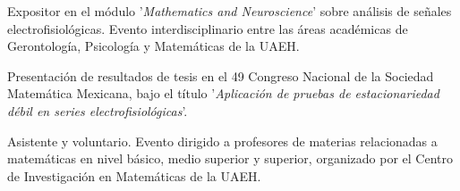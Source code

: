 \documentclass[a4paper,12pt]{memoir} %
\begin{document}
\Sep %



{Expositor en el módulo '\textit{Mathematics and Neuroscience}' sobre análisis de señales
electrofisiológicas. Evento interdisciplinario entre las áreas académicas de Gerontología,
Psicología y Matemáticas de la UAEH.}

{Presentación de resultados de tesis en el 49 Congreso Nacional de la 
Sociedad Matemática Mexicana, bajo el título 
'\textit{Aplicación de pruebas de estacionariedad débil en
series electrofisiológicas}'.}

{Asistente y voluntario. Evento dirigido a profesores de materias relacionadas a 
matemáticas en nivel básico, medio superior y superior, organizado por el Centro de
Investigación en Matemáticas de la UAEH.}

\Sep %



\end{document}
